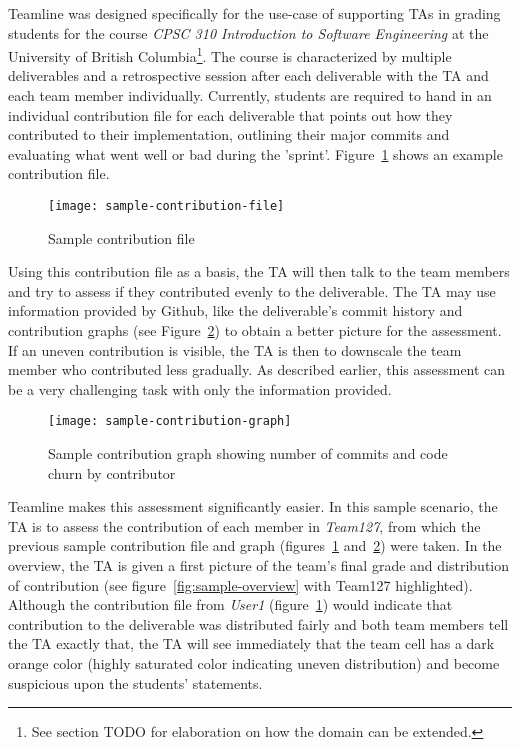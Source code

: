 \documentclass[../manifest.tex]{subfiles}
\begin{document}
Teamline was designed specifically for the use-case of supporting TAs in grading students for the course \textit{CPSC 310 Introduction to Software Engineering} at the University of British Columbia\footnote{See section TODO for elaboration on how the domain can be extended.}. The course is characterized by multiple deliverables and a retrospective session after each deliverable with the TA and each team member individually. Currently, students are required to hand in an individual contribution file for each deliverable that points out how they contributed to their implementation, outlining their major commits and evaluating what went well or bad during the 'sprint'. Figure~\ref{fig:sample-contribution-file} shows an example contribution file.

\begin{figure}[h]
  \centering
  \texttt{[image: sample-contribution-file]}
  \caption{Sample contribution file}
  \label{fig:sample-contribution-file}
\end{figure}

Using this contribution file as a basis, the TA will then talk to the team members and try to assess if they contributed evenly to the deliverable. The TA may use information provided by Github, like the deliverable's commit history and contribution graphs (see Figure~\ref{fig:sample-contribution-graph}) to obtain a better picture for the assessment. If an uneven contribution is visible, the TA is then to downscale the team member who contributed less gradually. As described earlier, this assessment can be a very challenging task with only the information provided.

\begin{figure}[h]
  \centering
  \texttt{[image: sample-contribution-graph]}
  \caption{Sample contribution graph showing number of commits and code churn by contributor}
  \label{fig:sample-contribution-graph}
\end{figure}

Teamline makes this assessment significantly easier. In this sample scenario, the TA is to assess the contribution of each member in \textit{Team127}, from which the previous sample contribution file and graph (figures~\ref{fig:sample-contribution-file} and~\ref{fig:sample-contribution-graph}) were taken. In the overview, the TA is given a first picture of the team's final grade and distribution of contribution (see figure~\ref{fig:sample-overview} with Team127 highlighted). Although the contribution file from \textit{User1} (figure~\ref{fig:sample-contribution-file}) would indicate that contribution to the deliverable was distributed fairly and both team members tell the TA exactly that, the TA will see immediately that the team cell has a dark orange color (highly saturated color indicating uneven distribution) and become suspicious upon the students' statements.
\end{document}
